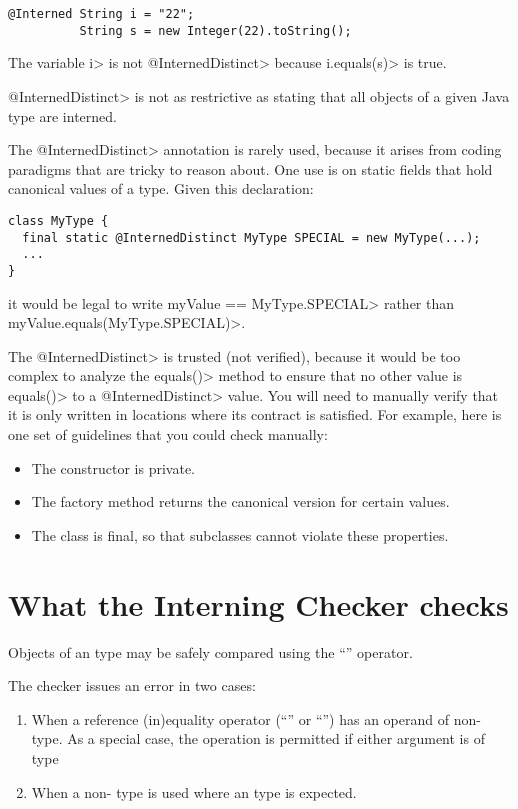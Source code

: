 \begin{Verbatim}
@Interned String i = "22";
          String s = new Integer(22).toString();
\end{Verbatim}

\noindent
The variable \<i> is not \<@InternedDistinct> because \<i.equals(s)> is true.

\<@InternedDistinct> is not as restrictive as stating that all objects of a
given Java type are interned.

The \<@InternedDistinct> annotation is rarely used, because it arises from
coding paradigms that are tricky to reason about.
%
One use is on static fields
that hold canonical values of a type.
Given this declaration:

\begin{Verbatim}
class MyType {
  final static @InternedDistinct MyType SPECIAL = new MyType(...);
  ...
}
\end{Verbatim}

\noindent
it would be legal to write \<myValue == MyType.SPECIAL> rather than
\<myValue.equals(MyType.SPECIAL)>.

The \<@InternedDistinct> is trusted (not verified), because it would be too
complex to analyze the \<equals()> method to ensure that no other value is
\<equals()> to a \<@InternedDistinct> value.  You will need to manually
verify that it is only written in locations where its contract is satisfied.
For example, here is one set of guidelines that you could check manually:
\begin{itemize}
\item The constructor is private.
\item The factory method returns the canonical version for certain values.
\item The class is final, so that subclasses cannot violate these properties.
\end{itemize}


\section{What the Interning Checker checks\label{interning-checks}}

Objects of an  type may be safely compared using the ``\code{==}''
operator.

The checker issues an error in two cases:

\begin{enumerate}

\item
  When a reference (in)equality operator (``\code{==}'' or ``\code{!=}'')
  has an operand of non- type.
  As a special case, the operation is permitted if either argument is of
   type

\item
  When a non- type is used
  where an  type
  is expected.

\end{enumerate}

